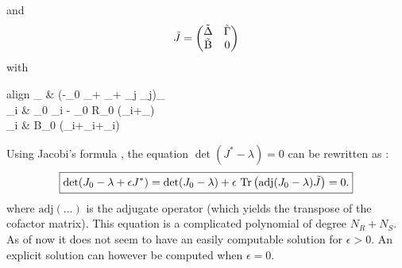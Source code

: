 \documentclass[12pt, titlepage]{report}
\begin{document}
	 and
	 \begin{equation}
	 \tilde{J} = \begin{pmatrix}
	 \tilde{\Delta} & \tilde{\Gamma} \\
	 \tilde{\text{B}} & 0
	 \end{pmatrix}
	 \end{equation}
	 with
	 \begin{empheq}{align}
	 \tilde{\Delta}_{\mu \nu} &  \left(-\Delta_0 _\mu + _\mu+  \sum_j \tilde{\alpha}_{\mu j}\right)\delta_{\mu \nu} \\
	 \tilde{\Gamma}_{\mu i} &  \alpha_0 \tilde{\alpha}_{\mu i} - \gamma_0 R_0 \left(\tilde{\gamma}_{i\mu}+_\mu\right) \\
	 _{i \mu} &  B_0 \left(\tilde{\sigma}_{i\mu}+\tilde{\gamma}_{i\mu}+_i\right)
	 \end{empheq}
	Using Jacobi's formula \cite{magnus_matrix_2019}, the equation $\det\left(J^*-\lambda\right)=0$ can be rewritten as :
	\begin{equation}
	\boxed{
	\det(J_0-\lambda + \epsilon J^*)=\det(J_0-\lambda)+\epsilon \ \trace{\text{adj}(J_0-\lambda)\tilde{J}}=0.
	}\label{eq : determinant variance first order}
	\end{equation}
	where $\text{adj}\left(\dots\right)$ is the adjugate operator (\ie which yields the transpose of the cofactor matrix). This equation is a complicated polynomial of degree $N_R+N_S$. As of now it does not seem to have an easily computable solution for $\epsilon > 0$. An explicit solution can however be computed when $\epsilon = 0$.
\end{document}
